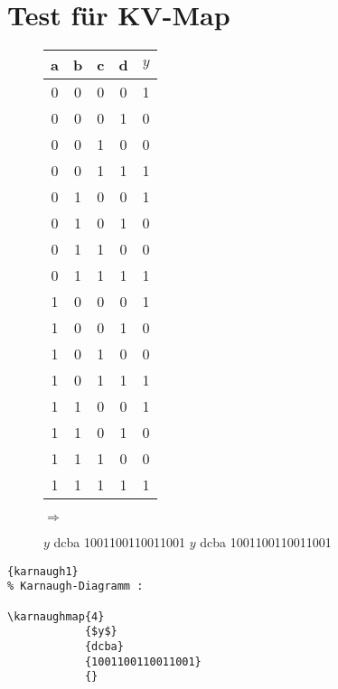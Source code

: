 

\section{Test für KV-Map}

\begin{figure}[h!]
\begin{minipage}{0.35\textwidth}
	\begin{tabular}{cccc|c}
		a
		& b
		& c
		& d
		&$y$\\
		\hline
		0 & 0 & 0 & 0 & 1 \\
		0 & 0 & 0 & 1 & 0 \\
		0 & 0 & 1 & 0 & 0 \\
		0 & 0 & 1 & 1 & 1 \\
		0 & 1 & 0 & 0 & 1 \\
		0 & 1 & 0 & 1 & 0 \\
		0 & 1 & 1 & 0 & 0 \\
		0 & 1 & 1 & 1 & 1 \\
		1 & 0 & 0 & 0 & 1 \\
		1 & 0 & 0 & 1 & 0 \\
		1 & 0 & 1 & 0 & 0 \\
		1 & 0 & 1 & 1 & 1 \\
		1 & 1 & 0 & 0 & 1 \\
		1 & 1 & 0 & 1 & 0 \\
		1 & 1 & 1 & 0 & 0 \\
		1 & 1 & 1 & 1 & 1 \\
	\end{tabular}
\end{minipage}
\begin{minipage}{0.1\textwidth}
	\Huge$\Rightarrow$\normalsize
\end{minipage}
\begin{minipage}{0.5\textwidth}
	\kvnoindex
	            {$y$}
		    {dcba}
		    {1001100110011001}
		    {}
	            {$y$}
		    {dcba}
		    {1001100110011001}
		    {%
			\thicklines
}\end{minipage}
\end{figure}
\begin{lstlisting}[caption=Karnaugh-Diagramm]{karnaugh1}
% Karnaugh-Diagramm : 

\karnaughmap{4}
            {$y$}
            {dcba}
            {1001100110011001}
            {}
\end{lstlisting}

